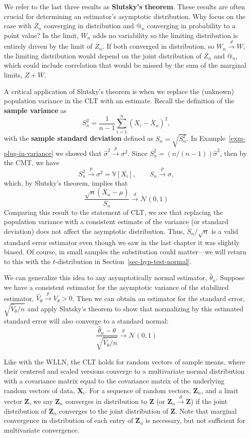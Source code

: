 \documentclass[
  13pt,
  letterpaper,
  DIV=11,
  numbers=noendperiod]{scrreprt}
\newcommand{\mb}{\bm}
\newcommand{\V}{\mathbb{V}}
\newcommand{\N}{\mathcal{N}}
\newcommand{\Xbar}{\overline{X}}
\newcommand{\X}{\mb{X}}
\newcommand{\inprob}{\overset{p}{\to}}
\newcommand{\indist}{\overset{d}{\to}}
\theoremstyle{plain}
\theoremstyle{plain}
\theoremstyle{definition}
\theoremstyle{definition}
\theoremstyle{remark}
\begin{document}
We refer to the last three results as \textbf{Slutsky's theorem}. These
results are often crucial for determining an estimator's asymptotic
distribution. Why focus on the case with \(Z_n\) converging in
distribution and \(@_n\) converging in probability to a point value? In
the limit, \(W_n\) adds no variability so the limiting distribution is
entirely driven by the limit of \(Z_n\). If both converged in
distribution, so \(W_n \indist W\), the limiting distribution would
depend on the joint distribution of \(Z_n\) and \(@_n\), which could
include correlation that would be missed by the sum of the marginal
limits, \(Z + W\).

A critical application of Slutsky's theorem is when we replace the
(unknown) population variance in the CLT with an estimate. Recall the
definition of the \textbf{sample variance} as \[
S_n^2 = \frac{1}{n-1} \sum_{i=1}^n (X_i - \Xbar_n)^2,
\] with the \textbf{sample standard deviation} defined as
\(S_{n} = \sqrt{S_{n}^2}\). In Example~\ref{exm-plug-in-variance} we
showed that \(\widehat{\sigma}^2 \inprob \sigma^2\). Since
\(S_n^2 = (n / (n-1))\widehat{\sigma}^2\), then by the CMT, we have \[ 
S_{n}^2 \inprob \sigma^2 = \V[X_i], \qquad S_{n} \inprob \sigma,
\] which, by Slutsky's theorem, implies that \[
\frac{\sqrt{n}\left(\Xbar_n - \mu\right)}{S_n} \indist \N(0, 1)
\] Comparing this result to the statement of CLT, we see that replacing
the population variance with a consistent estimate of the variance (or
standard deviation) does not affect the asymptotic distribution. Thus,
\(S_n / \sqrt{n}\) is a valid standard error estimator even though we
saw in the last chapter it was slightly biased. Of course, in small
samples the substitution could matter---we will return to this with the
\(t\)-distribution in Section~\ref{sec-hyp-test-normal}.

We can generalize this idea to any asymptotically normal estimator,
\(\widehat{\theta}_n\). Suppose we have a consistent estimator for the
asymptotic variance of the stabilized estimator,
\(\widehat{V}_{\theta} \inprob V_{\theta} > 0\). Then we can obtain an
estimator for the standard error, \(\sqrt{\widehat{V}_{\theta} / n}\)
and apply Slutsky's theorem to show that normalizing by this estimated
standard error will also converge to a standard normal: \[
\frac{\widehat{\theta}_n - \theta}{\sqrt{\widehat{V}_{\theta} / n}} \indist \N(0, 1)
\]

Like with the WLLN, the CLT holds for random vectors of sample means,
where their centered and scaled versions converge to a multivariate
normal distribution with a covariance matrix equal to the covariance
matrix of the underlying random vectors of data, \(\X_i\). For a
sequence of random vectors, \(\mb{Z}_n\), and a limit vector \(\mb{Z}\),
we say \(\mb{Z}_n\) converges in distribution to \(\mb{Z}\) (or
\(\mb{Z}_n \indist \mb{Z}\)) if the joint distribution of \(\mb{Z}_n\)
converges to the joint distribution of \(\mb{Z}\). Note that marginal
convergence in distribution of each entry of \(\mb{Z}_n\) is necessary,
but not sufficient for multivariate convergence.
\end{document}

